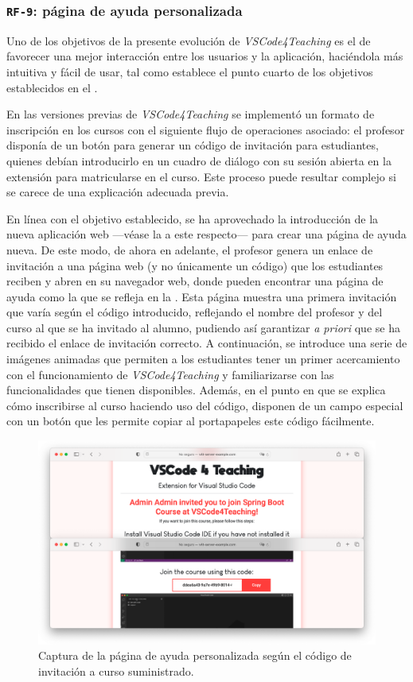 \subsubsection{\texttt{RF-9}: página de ayuda personalizada}
\label{subsec:rf9}

Uno de los objetivos de la presente evolución de \textit{VSCode4Teaching} es el de favorecer una mejor interacción entre los usuarios y la aplicación, haciéndola más intuitiva y fácil de usar, tal como establece el punto cuarto de los objetivos establecidos en el .

En las versiones previas de \textit{VSCode4Teaching} se implementó un formato de inscripción en los cursos con el siguiente flujo de operaciones asociado: el profesor disponía de un botón para generar un código de invitación para estudiantes, quienes debían introducirlo en un cuadro de diálogo con su sesión abierta en la extensión para matricularse en el curso. Este proceso puede resultar complejo si se carece de una explicación adecuada previa.

En línea con el objetivo establecido, se ha aprovechado la introducción de la nueva aplicación web ---véase la  a este respecto--- para crear una página de ayuda nueva. De este modo, de ahora en adelante, el profesor genera un enlace de invitación a una página web (y no únicamente un código) que los estudiantes reciben y abren en su navegador web, donde pueden encontrar una página de ayuda como la que se refleja en la . Esta página muestra una primera invitación que varía según el código introducido, reflejando el nombre del profesor y del curso al que se ha invitado al alumno, pudiendo así garantizar \textit{a priori} que se ha recibido el enlace de invitación correcto. A continuación, se introduce una serie de imágenes animadas que permiten a los estudiantes tener un primer acercamiento con el funcionamiento de \textit{VSCode4Teaching} y familiarizarse con las funcionalidades que tienen disponibles. Además, en el punto en que se explica cómo inscribirse al curso haciendo uso del código, disponen de un campo especial con un botón que les permite copiar al portapapeles este código fácilmente.

\begin{figure}[ht]
    \centering
    \includegraphics[width=\textwidth]{imagenes/utilizadas/4-3-implementacion/rf9-1.png}
    \caption{Captura de la página de ayuda personalizada según el código de invitación a curso suministrado.}
    \label{fig:reqf9-1}
\end{figure}
